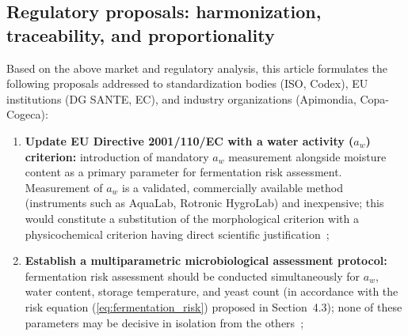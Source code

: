 \subsection{Regulatory proposals: harmonization, traceability, and proportionality}

Based on the above market and regulatory analysis, this article
formulates the following proposals addressed to standardization
bodies (ISO, Codex), EU institutions (DG SANTE, EC), and industry
organizations (Apimondia, Copa-Cogeca):

\begin{enumerate}
    \item \textbf{Update EU Directive 2001/110/EC with a water
          activity ($a_w$) criterion:}
          introduction of mandatory $a_w$ measurement alongside
          moisture content as a primary parameter for fermentation
          risk assessment. Measurement of $a_w$ is a validated,
          commercially available method (instruments such as
          AquaLab, Rotronic HygroLab) and inexpensive; this would
          constitute a substitution of the morphological criterion
          with a physicochemical criterion having direct scientific
          justification~\cite{ruegg1981,zamora2006};

    \item \textbf{Establish a multiparametric microbiological
          assessment protocol:} fermentation risk assessment should
          be conducted simultaneously for $a_w$, water content,
          storage temperature, and yeast count (in accordance with
          the risk equation (\ref{eq:fermentation_risk}) proposed
          in Section~4.3); none of these parameters may be
          decisive in isolation from the
          others~\cite{analytica2020,apinz2021};




\end{enumerate}
